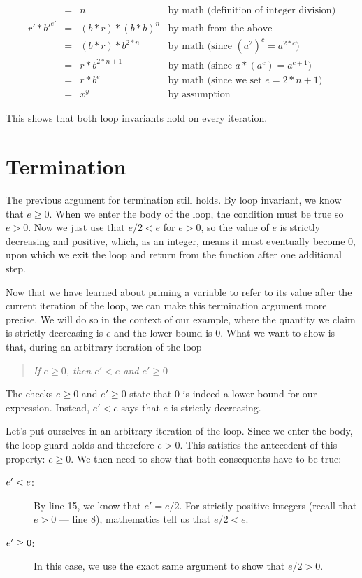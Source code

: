 \begin{description}
\begin{description}
$$\begin{array}{rcll}
    \\&=& n                   & \text{by math (definition of integer division)}
    \\[1ex]
            r' * {b'}^{e'}
      &=& (b*r) * {(b*b)}^{n} & \text{by math from the above}
    \\&=& (b*r) * b^{2*n}     & \text{by math (since $(a^2)^c = a^{2*c}$)}
    \\&=& r * b^{2*n + 1}     & \text{by math (since $a*(a^c) = a^{c+1}$)}
    \\&=& r * b^e             & \text{by math (since we set $e=2*n + 1$)}
    \\&=& x^y                 & \text{by assumption}
    \end{array}
    $$
  \end{description}
\end{description}
This shows that both loop invariants hold on every iteration.


\clearpage
\section{Termination}
\label{sec:contracts:termination2}

The previous argument for termination still holds.  By loop invariant,
we know that $e \geq 0$.  When we enter the body of the loop, the
condition must be true so $e > 0$.  Now we just use that $e/2 < e$ for
$e > 0$, so the value of $e$ is strictly decreasing and positive,
which, as an integer, means it must eventually become $0$, upon which
we exit the loop and return from the function after one additional
step.

Now that we have learned about priming a variable to refer to its
value after the current iteration of the loop, we can make this
termination argument more precise.  We will do so in the context of
our example, where the quantity we claim is strictly decreasing is $e$
and the lower bound is 0.  What we want to show is that, during an
arbitrary iteration of the loop
\begin{quote}\em
  If $e \ge 0$, then $e' < e$ and $e' \ge 0$
\end{quote}
The checks $e \ge 0$ and $e' \ge 0$ state that 0 is indeed a lower
bound for our expression.  Instead, $e' < e$ says that $e$ is strictly
decreasing.

Let's put ourselves in an arbitrary iteration of the loop.  Since we
enter the body, the loop guard holds and therefore $e > 0$.  This
satisfies the antecedent of this property: $e \ge 0$.  We then need to
show that both consequents have to be true:
\begin{description}
\item[$\boldmath{e' < e}$: ]%
  By line 15, we know that $e' = e/2$.  For strictly positive integers
  (recall that $e > 0$ --- line 8), mathematics tell us that $e/2 <
  e$.

\item[$\boldmath{e' \ge 0}$: ]%
  In this case, we use the exact same argument to show that $e/2 > 0$.
\end{description}


